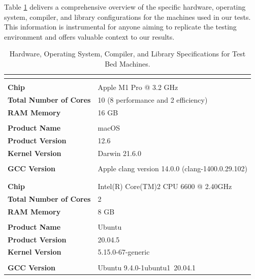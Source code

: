 \documentclass[a4paper,fleqn]{cas-dc}
\begin{document}
Table \ref{tab:machinesSpecs} delivers a comprehensive overview of the specific hardware, operating system, compiler, and library configurations for the machines used in our tests. This information is instrumental for anyone aiming to replicate the testing environment and offers valuable context to our results.

\begin{table}[h]
	\scriptsize
	\caption{Hardware, Operating System, Compiler, and Library Specifications for Test Bed Machines.}
	\label{tab:machinesSpecs}
	\begin{tabular}{>{\bfseries}p{3cm} p{4cm}}
	\toprule
	\multicolumn{2}{c}{\textbf{Machine1}} \\
	\toprule
	\toprule
	\multicolumn{2}{c}{\textbf{Hardware}} \\
	\midrule
	Chip                & Apple M1 Pro @ 3.2 GHz \\
	Total Number of Cores & 10 (8 performance and 2 efficiency) \\
	RAM Memory          & 16 GB \\
	\midrule
	\multicolumn{2}{c}{\textbf{Operating System}} \\
	\midrule
	Product Name         & macOS \\
	Product Version      & 12.6 \\
	Kernel Version        & Darwin 21.6.0 \\
	\midrule
	\multicolumn{2}{c}{\textbf{Compiler}} \\
	\midrule
	GCC Version         & Apple clang version 14.0.0 (clang-1400.0.29.102) \\
	\bottomrule
	
	\toprule
	\multicolumn{2}{c}{\textbf{Machine2}} \\
	\toprule
	\toprule
	\multicolumn{2}{c}{\textbf{Hardware}} \\
	\midrule
	Chip                & Intel(R) Core(TM)2 CPU 6600 @ 2.40GHz \\
	Total Number of Cores & 2 \\
	RAM Memory          & 8 GB \\
	\midrule
	\multicolumn{2}{c}{\textbf{Operating System}} \\
	\midrule
	Product Name         & Ubuntu \\
	Product Version      & 20.04.5 \\
	Kernel Version        & 5.15.0-67-generic \\
	\midrule
	\multicolumn{2}{c}{\textbf{Compiler}} \\
	\midrule
	GCC Version         & Ubuntu 9.4.0-1ubuntu1~20.04.1 \\
	\midrule
	\bottomrule
	

\end{tabular}
\end{table}
\end{document}
